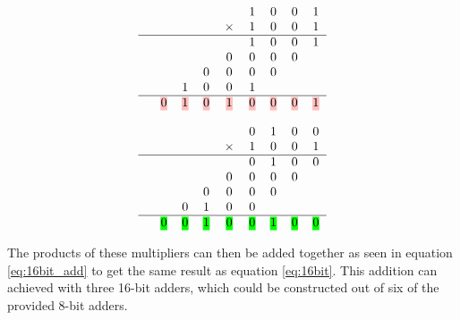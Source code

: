 \documentclass[11pt]{article}
\newcommand{\hlc}[2][yellow]{{%
    \colorlet{foo}{#1}%
    \sethlcolor{foo}\hl{#2}}%
}
\begin{document}
\begin{minipage}{.5\linewidth}
    \begin{equation}
        \label{eq:pink}
        \begin{tabular}{c c c c c c c c c }
            &   &   &   &   & 1 & 0 & 0 & 1 \\
            &   &   &   &  $\times$ & 1 & 0 & 0 & 1 \\
            \hline
            &   &   &   &   & 1 & 0 & 0 & 1 \\
            &   &   &   & 0 & 0 & 0 & 0 &   \\
            &   &   & 0 & 0 & 0 & 0 &   &   \\
            &   & 1 & 0 & 0 & 1 &   &   &   \\
            \hline
            & \hlc[pink]{0} & \hlc[pink]{1} & \hlc[pink]{0} & \hlc[pink]{1} & \hlc[pink]{0} & \hlc[pink]{0} & \hlc[pink]{0} & \hlc[pink]{1} \\
        \end{tabular} 
    \end{equation}
    \end{minipage}%
    \begin{minipage}{.5\linewidth}
        \begin{equation}
            \label{eq:green}
            \begin{tabular}{c c c c c c c c c }
                &   &   &   &   & 0 & 1 & 0 & 0 \\
                &   &   &   &  $\times$ & 1 & 0 & 0 & 1 \\
                \hline
                &   &   &   &   & 0 & 1 & 0 & 0 \\
                &   &   &   & 0 & 0 & 0 & 0 &   \\
                &   &   & 0 & 0 & 0 & 0 &   &   \\
                &   & 0 & 1 & 0 & 0 &   &   &   \\
                \hline
                & \hlc[green]{0} & \hlc[green]{0} & \hlc[green]{1} & \hlc[green]{0} & \hlc[green]{0} & \hlc[green]{1} & \hlc[green]{0} & \hlc[green]{0} \\
            \end{tabular} 
        \end{equation}
\end{minipage}

The products of these multipliers can then be added together as seen in equation \ref{eq:16bit_add} to get the same result as equation \ref{eq:16bit}.
This addition can achieved with three 16-bit adders, which could be constructed out of six of the provided 8-bit adders.
\end{document}
